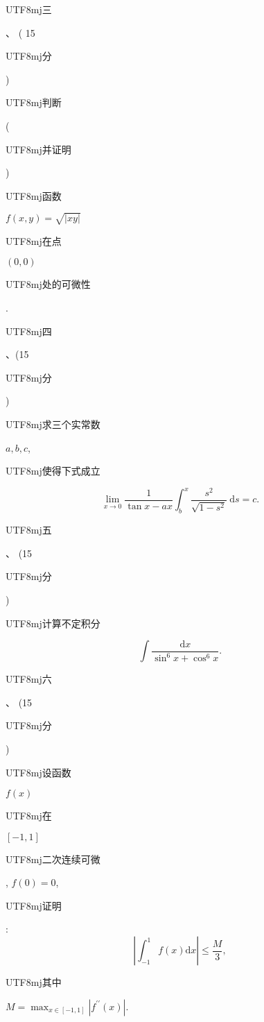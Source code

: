 \documentclass[10pt]{article}
\begin{document}
\begin{CJK}{UTF8}{mj}三\end{CJK}、 ( 15 \begin{CJK}{UTF8}{mj}分\end{CJK}) \begin{CJK}{UTF8}{mj}判断\end{CJK}(\begin{CJK}{UTF8}{mj}并证明\end{CJK}) \begin{CJK}{UTF8}{mj}函数\end{CJK} $f(x, y)=\sqrt{|x y|}$ \begin{CJK}{UTF8}{mj}在点\end{CJK} $(0,0)$ \begin{CJK}{UTF8}{mj}处的可微性\end{CJK}.

\begin{CJK}{UTF8}{mj}四\end{CJK}、(15 \begin{CJK}{UTF8}{mj}分\end{CJK}) \begin{CJK}{UTF8}{mj}求三个实常数\end{CJK} $a, b, c$, \begin{CJK}{UTF8}{mj}使得下式成立\end{CJK}
$$
\lim _{x \rightarrow 0} \frac{1}{\tan x-a x} \int_{b}^{x} \frac{s^{2}}{\sqrt{1-s^{2}}} \mathrm{~d} s=c .
$$
\begin{CJK}{UTF8}{mj}五\end{CJK}、 (15 \begin{CJK}{UTF8}{mj}分\end{CJK}) \begin{CJK}{UTF8}{mj}计算不定积分\end{CJK}
$$
\int \frac{\mathrm{d} x}{\sin ^{6} x+\cos ^{6} x} .
$$
\begin{CJK}{UTF8}{mj}六\end{CJK}、 (15 \begin{CJK}{UTF8}{mj}分\end{CJK}) \begin{CJK}{UTF8}{mj}设函数\end{CJK} $f(x)$ \begin{CJK}{UTF8}{mj}在\end{CJK} $[-1,1]$ \begin{CJK}{UTF8}{mj}二次连续可微\end{CJK}, $f(0)=0$, \begin{CJK}{UTF8}{mj}证明\end{CJK}:
$$
\left|\int_{-1}^{1} f(x) \mathrm{d} x\right| \leq \frac{M}{3},
$$
\begin{CJK}{UTF8}{mj}其中\end{CJK} $M=\max _{x \in[-1,1]}\left|f^{\prime \prime}(x)\right|$.
\end{document}
